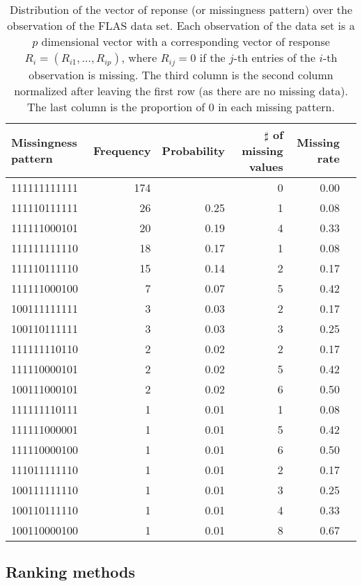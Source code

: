 \begin{table}[ht]
\centering
\begin{tabular}{lrrrrr}
  \hline
  Missingness pattern & Frequency & Probability & $\sharp$ of missing values & Missing rate \\
  \hline
  111111111111 & 174 &      &   0 & 0.00 \\
  111110111111 &  26 & 0.25 &   1 & 0.08 \\
  111111000101 &  20 & 0.19 &   4 & 0.33 \\
  111111111110 &  18 & 0.17 &   1 & 0.08 \\
  111110111110 &  15 & 0.14 &   2 & 0.17 \\
  111111000100 &   7 & 0.07 &   5 & 0.42 \\
  100111111111 &   3 & 0.03 &   2 & 0.17 \\
  100110111111 &   3 & 0.03 &   3 & 0.25 \\
  111111110110 &   2 & 0.02 &   2 & 0.17 \\
  111110000101 &   2 & 0.02 &   5 & 0.42 \\
  100111000101 &   2 & 0.02 &   6 & 0.50 \\
  111111110111 &   1 & 0.01 &   1 & 0.08 \\
  111111000001 &   1 & 0.01 &   5 & 0.42 \\
  111110000100 &   1 & 0.01 &   6 & 0.50 \\
  111011111110 &   1 & 0.01 &   2 & 0.17 \\
  100111111110 &   1 & 0.01 &   3 & 0.25 \\
  100110111110 &   1 & 0.01 &   4 & 0.33 \\
  100110000100 &   1 & 0.01 &   8 & 0.67 \\
  \hline
\end{tabular}
\caption{
  Distribution of the vector of reponse (or missingness pattern) over the
  observation of the FLAS data set.  Each observation of the data set is a $p$
  dimensional vector with a corresponding vector of response $R_i = (R_{i1},
  \dots, R_{ip})$, where $R_{ij} = 0$ if the $j$-th entries of the $i$-th observation is
  missing. The third column is the second column normalized after leaving the
  first row (as there are no missing data). The last column is the proportion
  of $0$ in each missing pattern.}
\label{tbl:flas:missingness:pattern}
\end{table}

\subsection{Ranking methods}

